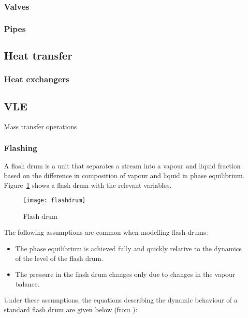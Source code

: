 \subsubsection{Valves}


\subsubsection{Pipes}


\subsection{Heat transfer}
\subsubsection{Heat exchangers}


\subsection{VLE}
Mass transfer operations 



\subsubsection{Flashing}
A flash drum is a unit that separates a stream into a vapour and
liquid fraction based on the difference in composition of vapour and
liquid in phase equilibrium.  Figure~\ref{fig:flashdrum} shows a flash
drum with the relevant variables.

\begin{figure}[htbp]
  \centering
  \texttt{[image: flashdrum]}
  \caption{Flash drum}
  \label{fig:flashdrum}
\end{figure}

The following assumptions are common when modelling flash drums:

\begin{itemize}
\item The phase equilibrium is achieved fully and quickly relative to
  the dynamics of the level of the flash drum.
\item The pressure in the flash drum changes only due to changes in
  the vapour balance.
\end{itemize}

Under these assumptions, the equations describing the dynamic
behaviour of a standard flash drum are given below (from \citet{eich-soellner.lory.ea1997stationary}):

